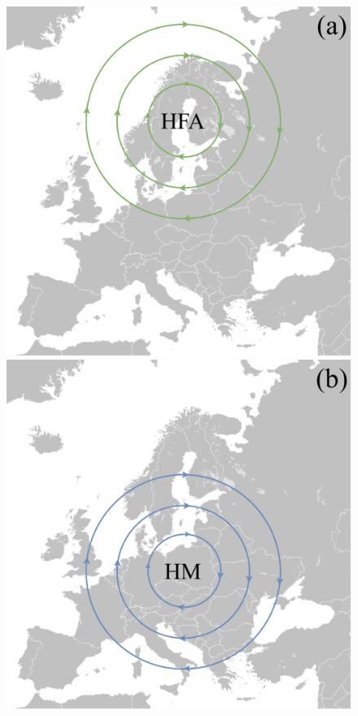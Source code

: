 \begin{figure}[H]
    \centering
    \begin{minipage}{0.32\textwidth}
        \includegraphics[width=\linewidth]{Figures/HFA.pdf}
    \end{minipage}
    \hfill
    \begin{minipage}{0.32\textwidth}
        \includegraphics[width=\linewidth]{Figures/HM.pdf}

\end{minipage}
\end{figure}
